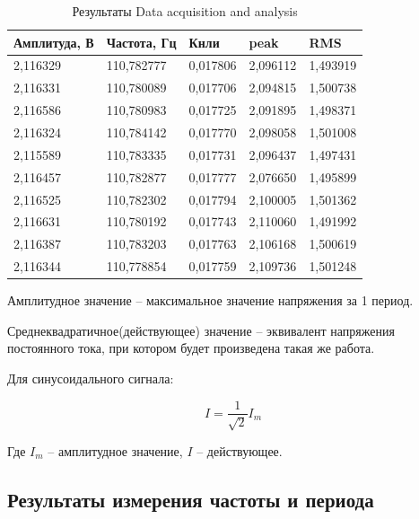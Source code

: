 \documentclass[a4paper,14pt]{article}
\begin{document}
\begin{table}[H]
	\centering
	\caption{Результаты Data acquisition and analysis}
	\label{tab:daa}
	\begin{tabular}{|l|l|l|l|l|}
		\hline
		Амплитуда, В & Частота, Гц & Кнли     & peak     & RMS      \\ \hline
		2,116329     & 110,782777  & 0,017806 & 2,096112 & 1,493919 \\ \hline
		2,116331     & 110,780089  & 0,017706 & 2,094815 & 1,500738 \\ \hline
		2,116586     & 110,780983  & 0,017725 & 2,091895 & 1,498371 \\ \hline
		2,116324     & 110,784142  & 0,017770 & 2,098058 & 1,501008 \\ \hline
		2,115589     & 110,783335  & 0,017731 & 2,096437 & 1,497431 \\ \hline
		2,116457     & 110,782877  & 0,017777 & 2,076650 & 1,495899 \\ \hline
		2,116525     & 110,782302  & 0,017794 & 2,100005 & 1,501362 \\ \hline
		2,116631     & 110,780192  & 0,017743 & 2,110060 & 1,491992 \\ \hline
		2,116387     & 110,783203  & 0,017763 & 2,106168 & 1,500619 \\ \hline
		2,116344     & 110,778854  & 0,017759 & 2,109736 & 1,501248 \\ \hline
	\end{tabular}
\end{table}

Амплитудное значение -- максимальное значение напряжения за 1 период.

Среднеквадратичное(действующее) значение -- эквивалент напряжения постоянного тока, при котором будет произведена такая же работа.

Для синусоидального сигнала:

$$ I = \frac{1}{\sqrt{2}} I_m $$

Где $I_m$ -- амплитудное значение, $I$ -- действующее.

\subsection{Результаты измерения частоты и периода}
\end{document}
